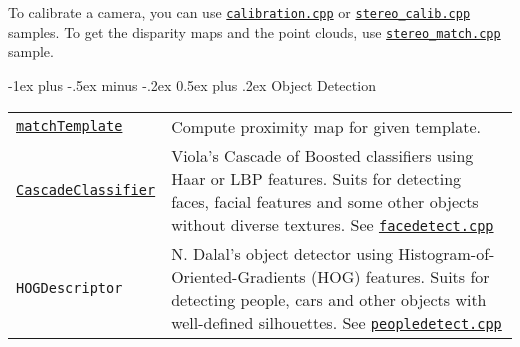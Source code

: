 \documentclass[10pt,landscape]{article}
\makeatletter
\renewcommand{\section}{\@startsection{section}{1}{0mm}%
                                {-1ex plus -.5ex minus -.2ex}%
                                {0.5ex plus .2ex}%
                                {\normalfont\large\bfseries}}
\makeatother
\begin{document}
\begin{multicols}{3}
\begin{tabular}{@{}p{\the\MyLen}%
                @{}p{\linewidth-\the\MyLen}@{}}
\end{tabular}

To calibrate a camera, you can use \texttt{\href{https://github.com/Itseez/opencv/tree/master/samples/cpp/calibration.cpp}{calibration.cpp}} or
\texttt{\href{https://github.com/Itseez/opencv/tree/master/samples/cpp/stereo\_calib.cpp}{stereo\_calib.cpp}} samples.
To get the disparity maps and the point clouds, use
\texttt{\href{https://github.com/Itseez/opencv/tree/master/samples/cpp/stereo\_match.cpp}{stereo\_match.cpp}} sample.

\section{Object Detection}

\begin{tabular}{@{}p{\the\MyLen}%
                @{}p{\linewidth-\the\MyLen}@{}}
                \texttt{\href{http://docs.opencv.org/modules/imgproc/doc/object_detection.html\#matchtemplate}{matchTemplate}} & Compute proximity map for given template.\\

\texttt{\href{http://docs.opencv.org/modules/objdetect/doc/cascade_classification.html\#cascadeclassifier}{CascadeClassifier}} & Viola's Cascade of Boosted classifiers using Haar or LBP features. Suits for detecting faces, facial features and some other objects without diverse textures. See \texttt{\href{https://github.com/Itseez/opencv/tree/master/samples/c/facedetect.cpp}{facedetect.cpp}}\\

\texttt{{HOGDescriptor}} & N. Dalal's object detector using Histogram-of-Oriented-Gradients (HOG) features. Suits for detecting people, cars and other objects with well-defined silhouettes. See \texttt{\href{https://github.com/Itseez/opencv/tree/master/samples/cpp/peopledetect.cpp}{peopledetect.cpp}}\\

\end{tabular}

%
%
%

\end{multicols}
\end{document}
